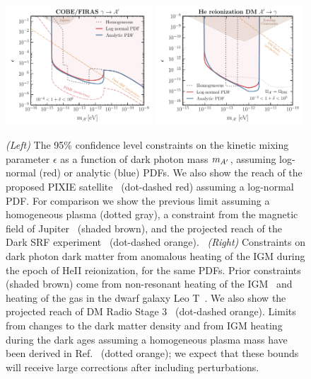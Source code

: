 \documentclass[prd,aps,10pt,nofootinbib,twocolumn,superscriptaddress,preprintnumbers,balancelastpage,longbibliography]{revtex4-1}
\begin{document}
%
\begin{figure}[!htbp]
    \centering
    \includegraphics[width=0.49\textwidth]{plots/limit}
    \includegraphics[width=0.49\textwidth]{plots/limit_DP_DM.pdf}
    \caption{\emph{(Left)} The 95\% confidence level constraints on the kinetic mixing parameter $\epsilon$ as a function of dark photon mass $m_{A^\prime}$, assuming log-normal (red) or analytic (blue) PDFs.  We also show the reach of the proposed PIXIE satellite~\cite{Kogut:2011xw} (dot-dashed red) assuming a log-normal PDF\@.  For comparison we show the previous limit assuming a homogeneous plasma (dotted gray), a constraint from the magnetic field of Jupiter~\cite{Davis:1975mn,Ahlers:2008qc} (shaded brown), and the projected reach of the Dark SRF experiment~\cite{HarnikSRF,GrassellinoSRF} (dot-dashed orange).~
\emph{(Right)} Constraints on dark photon dark matter from anomalous heating of the IGM during the epoch of HeII reionization, for the same PDFs. Prior constraints (shaded brown) come from non-resonant heating of the IGM~\cite{McDermott:2019lch} and heating of the gas in the dwarf galaxy Leo T~\cite{Wadekar:2019xnf}.  We also show the projected reach of DM Radio Stage 3~\cite{Chaudhuri:2014dla,Silva-Feaver:2016qhh,Battaglieri:2017aum} (dot-dashed orange). Limits from changes to the dark matter density and from IGM heating during the dark ages assuming a homogeneous plasma mass have been derived in Ref.~\cite{McDermott:2019lch} (dotted orange); we expect that these bounds will receive large corrections after including perturbations.~} 
    \label{fig:limit}
\end{figure}
%
\end{document}
